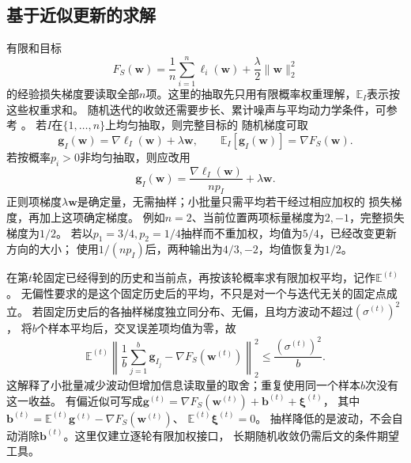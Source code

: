 \subsection{基于近似更新的求解}
\label{sec:opt-stochastic-gradient-stability}

有限和目标
\[
  F_S(\bm{w})=\frac1n\sum_{i=1}^n\ell_i(\bm{w})
  +\frac{\lambda}{2}\lVert\bm{w}\rVert_2^2
\]
的经验损失梯度要读取全部$n$项。这里的抽取先只用有限概率权重理解，$\mathbb E_I$表示按这些权重求和。
随机迭代的收敛还需要步长、累计噪声与平均动力学条件，可参考
。
若$I$在$\{1,\ldots,n\}$上均匀抽取，则完整目标的
随机梯度可取
\[
  \bm{g}_I(\bm{w})
  =\nabla\ell_I(\bm{w})+\lambda\bm{w},\qquad
  \mathbb{E}_I[\bm{g}_I(\bm{w})]
  =\nabla F_S(\bm{w}).
\]
若按概率$p_i>0$非均匀抽取，则应改用
\[
  \bm{g}_I(\bm{w})
  =\frac{\nabla\ell_I(\bm{w})}{np_I}+\lambda\bm{w}.
\]
正则项梯度$\lambda\bm{w}$是确定量，无需抽样；小批量只需平均若干经过相应加权的
损失梯度，再加上这项确定梯度。
例如$n=2$、当前位置两项标量梯度为$2,-1$，完整损失梯度为$1/2$。
若以$p_1=3/4,p_2=1/4$抽样而不重加权，均值为$5/4$，已经改变更新方向的大小；
使用$1/(np_I)$后，两种输出为$4/3,-2$，均值恢复为$1/2$。

在第$t$轮固定已经得到的历史和当前点，再按该轮概率求有限加权平均，记作$\mathbb E^{(t)}$。
无偏性要求的是这个固定历史后的平均，不只是对一个与迭代无关的固定点成立。
若固定历史后的各抽样梯度独立同分布、无偏，且均方波动不超过$(\sigma^{(t)})^2$，
将$b$个样本平均后，交叉误差项均值为零，故
\[
 \mathbb E^{(t)}\left\|\frac1b\sum_{j=1}^b\bm g_{I_j}
             -\nabla F_S(\bm w^{(t)})\right\|_2^2
 \leq\frac{(\sigma^{(t)})^2}{b}.
\]
这解释了小批量减少波动但增加信息读取量的取舍；重复使用同一个样本$b$次没有这一收益。
有偏近似可写成$\bm g^{(t)}=\nabla F_S(\bm w^{(t)})+\bm b^{(t)}+\bm\xi^{(t)}$，
其中$\bm b^{(t)}=\mathbb E^{(t)}\bm g^{(t)}-\nabla F_S(\bm w^{(t)})$、
$\mathbb E^{(t)}\bm\xi^{(t)}=0$。
抽样降低的是波动，不会自动消除$\bm b^{(t)}$。这里仅建立逐轮有限加权接口，
长期随机收敛仍需后文的条件期望工具。

